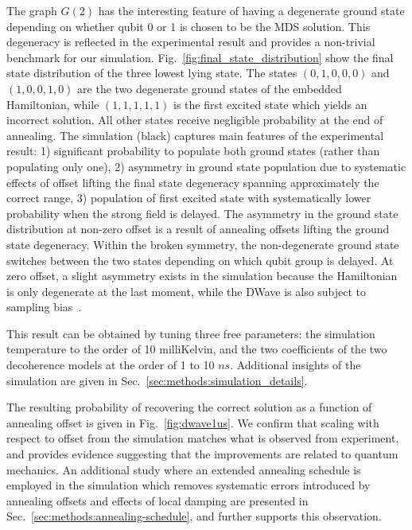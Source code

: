 \documentclass[prd,twocolumn,tightenlines,preprintnumbers,showpacs,superscriptaddress,notitlepage,nofootinbib,eqsecnum,floatfix,longbibliography,aps,10pt]{revtex4-2}
\begin{document}
The graph $G(2)$ has the interesting feature of having a degenerate ground state depending on whether qubit 0 or 1 is chosen to be the MDS solution.
This degeneracy is reflected in the experimental result and provides a non-trivial benchmark for our simulation.
Fig.~\ref{fig:final_state_distribution} show the final state distribution of the three lowest lying state.
The states $(0, 1, 0, 0, 0)$ and $(1, 0, 0, 1, 0)$ are the two degenerate ground states of the embedded Hamiltonian, while $(1, 1, 1, 1, 1)$ is the first excited state which yields an incorrect solution.
All other states receive negligible probability at the end of annealing.
The simulation (black) captures main features of the experimental result: 1) significant probability to populate both ground states (rather than populating only one), 2) asymmetry in ground state population due to systematic effects of offset lifting the final state degeneracy spanning approximately the correct range, 3) population of first excited state with systematically lower probability when the strong field is delayed. The asymmetry in the ground state distribution at non-zero offset is a result of annealing offsets lifting the ground state degeneracy.
Within the broken symmetry, the non-degenerate ground state switches between the two states depending on which qubit group is delayed. At zero offset, a slight asymmetry exists in the simulation because the Hamiltonian is only degenerate at the last moment, while the DWave is also subject to sampling bias~\cite{2016PhRvA..93e2320K, 2017PhRvL.118g0502M}.

This result can be obtained by tuning three free parameters: the simulation temperature to the order of 10 milliKelvin, and the two coefficients of the two decoherence models at the order of 1 to 10 $ns$.
Additional insights of the simulation are given in Sec.~\ref{sec:methods:simulation_details}.

The resulting probability of recovering the correct solution as a function of annealing offset is given in Fig.~\ref{fig:dwave1us}.
We confirm that scaling with respect to offset from the simulation matches what is observed from experiment, and provides evidence suggesting that the improvements are related to quantum mechanics.
An additional study where an extended annealing schedule is employed in the simulation which removes systematic errors introduced by annealing offsets and effects of local damping are presented in Sec.~\ref{sec:methods:annealing-schedule}, and further supports this observation.
\end{document}
